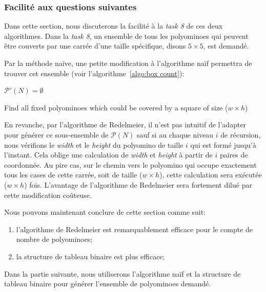 \documentclass[a4paper,12pt]{article}
\begin{document}
	\subsubsection{Facilité aux questions suivantes}
	\par Dans cette section, nous discuterons la facilité à la \textit{task 8} de ces deux algorithmes. Dans la \textit{task 8}, un ensemble de tous les polyominoes qui peuvent être couverts par une carrée d'une taille spécifique, disons \textit{$5\times5$}, est demandé.
	\par Par la méthode naïve, une petite modification à l'algorithme naïf permettra de trouver cet ensemble (voir l'algorithme~\ref{algo:box count}):
	\begin{algorithm}
		$\mathcal{P'}(N) = \emptyset$\;
		\caption{Find all fixed polyominoes which could be covered by a square of size ($w\times h$)}
		\label{algo:box count}
	\end{algorithm}
	\par En revanche, par l'algorithme de Redelmeier, il n'est pas intuitif de l'adapter pour générer ce sous-ensemble de $\mathcal{P}(N)$ sauf si au chaque niveau $i$ de récursion, nous vérifions le \textit{width} et le \textit{height} du polyomino de taille $i$ qui est formé jusqu'à l'instant. Cela oblige une calculation de \textit{width} et \textit{height} à partir de $i$ paires de coordonnée. Au pire cas, sur le chemin vers le polyomino qui occupe exactement tous les cases de cette carrée, soit de taille ($w\times h$), cette calculation sera exécutée ($w\times h$) fois. L'avantage de l'algorithme de Redelmeier sera fortement dilué par cette modification coûteuse.
	\vspace{1cm}
	\par Nous pouvons maintenant conclure de cette section comme suit:
	\begin{enumerate}
		\item l'algorithme de Redelmeier est remarquablement efficace pour le compte de nombre de polyominoes;
		\item la structure de tableau binaire est plus efficace;
	\end{enumerate}
	\par Dans la partie suivante, nous utiliserons l'algorithme naïf et la structure de tableau binaire pour générer l'ensemble de polyominoes demandé.
	
\end{document}
